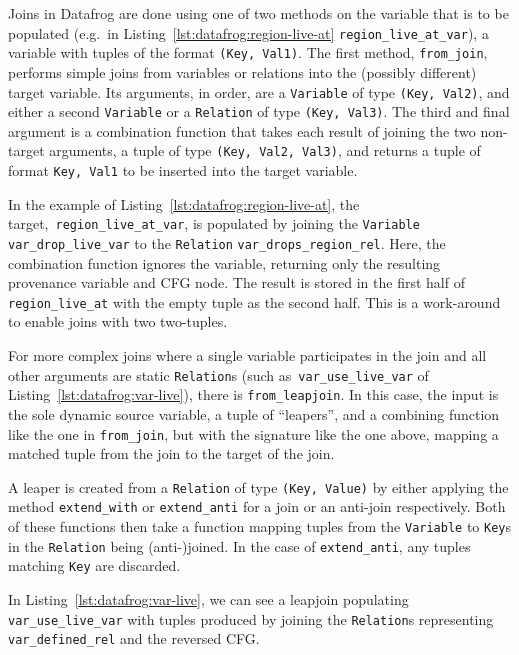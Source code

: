 \documentclass[11pt,a4paper,twoside,openany]{report}
\newcommand{\InRust}[1]{\texttt{#1}}
\begin{document}
Joins in Datafrog are done using one of two methods on the variable that is to
be populated (e.g.\ in Listing~\ref{lst:datafrog:region-live-at}
\InRust{region_live_at_var}), a variable with tuples of the format \InRust{(Key,
  Val1)}. The first method, \InRust{from_join}, performs simple joins from
variables or relations into the (possibly different) target variable. Its
arguments, in order, are a \InRust{Variable} of type \InRust{(Key, Val2)}, and
either a second \InRust{Variable} or a \InRust{Relation} of type \InRust{(Key,
  Val3)}. The third and final argument is a combination function that takes each
result of joining the two non-target arguments, a tuple of type \InRust{(Key,
  Val2, Val3)}, and returns a tuple of format \InRust{Key, Val1} to be inserted
into the target variable.

In the example of Listing~\ref{lst:datafrog:region-live-at}, the
target,~\InRust{region_live_at_var}, is populated by joining the
\InRust{Variable} \InRust{var_drop_live_var} to the \InRust{Relation}
\InRust{var_drops_region_rel}. Here, the combination function ignores the
variable, returning only the resulting provenance variable and CFG node. The
result is stored in the first half of \InRust{region_live_at} with the
empty tuple as the second half. This is a work-around to enable joins with two
two-tuples.

For more complex joins where a single variable participates in the join and all
other arguments are static \InRust{Relation}s (such as~\InRust{var_use_live_var}
of Listing~\ref{lst:datafrog:var-live}), there is \InRust{from_leapjoin}. In
this case, the input is the sole dynamic source variable, a tuple of
``leapers'', and a combining function like the one in \InRust{from_join}, but
with the signature like the one above, mapping a matched tuple from the join to
the target of the join.

A leaper is created from a \InRust{Relation} of type \InRust{(Key, Value)} by
either applying the method \InRust{extend_with} or \InRust{extend_anti} for a
join or an anti-join respectively. Both of these functions then take a function
mapping tuples from the \InRust{Variable} to \InRust{Key}s in the
\InRust{Relation} being (anti-)joined. In the case of \InRust{extend_anti}, any
tuples matching \InRust{Key} are discarded.

In Listing~\ref{lst:datafrog:var-live}, we can see a leapjoin populating
\InRust{var_use_live_var} with tuples produced by joining the \InRust{Relation}s
representing \InRust{var_defined_rel} and the reversed CFG\@.
\end{document}
